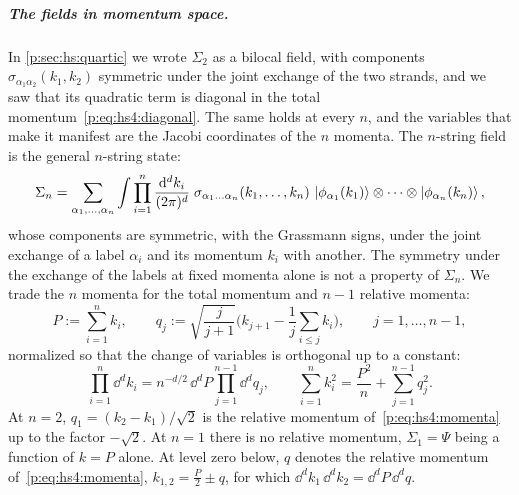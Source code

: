 \subparagraph{The fields in momentum space.}

In \cref{p:sec:hs:quartic} we wrote $\Sigma_2$ as a bilocal field, with components $\sigma_{\alpha_1 \alpha_2}(k_1, k_2)$ symmetric under the joint exchange of the two strands, and we saw that its quadratic term is diagonal in the total momentum~\eqref{p:eq:hs4:diagonal}.
The same holds at every $n$, and the variables that make it manifest are the Jacobi coordinates of the $n$ momenta.
The $n$-string field is the general $n$-string state:
\begin{equation}
  \label{p:eq:ws:sigma-n}
  \Sigma_n
    = \sum_{\alpha_1, \ldots, \alpha_n} \int \prod_{i = 1}^n \frac{\mathrm{d}^d k_i}{(2\pi)^d} \;
      \sigma_{\alpha_1 \ldots \alpha_n}(k_1, \ldots, k_n) \,
      \ket{\phi_{\alpha_1}(k_1)} \otimes \cdots \otimes \ket{\phi_{\alpha_n}(k_n)},
\end{equation}
whose components are symmetric, with the Grassmann signs, under the joint exchange of a label $\alpha_i$ and its momentum $k_i$ with another.
The symmetry under the exchange of the labels at fixed momenta alone is not a property of $\Sigma_n$.
We trade the $n$ momenta for the total momentum and $n - 1$ relative momenta:
\begin{equation}
  \label{p:eq:ws:jacobi}
  P
    := \sum_{i = 1}^n k_i,
  \qquad
  q_j
    := \sqrt{\frac{j}{j + 1}} \Big( k_{j + 1} - \frac{1}{j} \sum_{i \le j} k_i \Big),
  \qquad
  j
    = 1, \ldots, n - 1,
\end{equation}
normalized so that the change of variables is orthogonal up to a constant:
\begin{equation}
  \label{p:eq:ws:jacobi-measure}
  \prod_{i = 1}^n \dd^d k_i
    = n^{-d/2} \, \dd^d P \prod_{j = 1}^{n - 1} \dd^d q_j,
  \qquad
  \sum_{i = 1}^n k_i^2
    = \frac{P^2}{n} + \sum_{j = 1}^{n - 1} q_j^2.
\end{equation}
At $n = 2$, $q_1 = (k_2 - k_1) / \sqrt 2$ is the relative momentum of~\eqref{p:eq:hs4:momenta} up to the factor $- \sqrt 2$.
At $n = 1$ there is no relative momentum, $\Sigma_1 = \Psi$ being a function of $k = P$ alone.
At level zero below, $q$ denotes the relative momentum of~\eqref{p:eq:hs4:momenta}, $k_{1,2} = \tfrac{P}{2} \pm q$, for which $\dd^d k_1 \, \dd^d k_2 = \dd^d P \, \dd^d q$.

